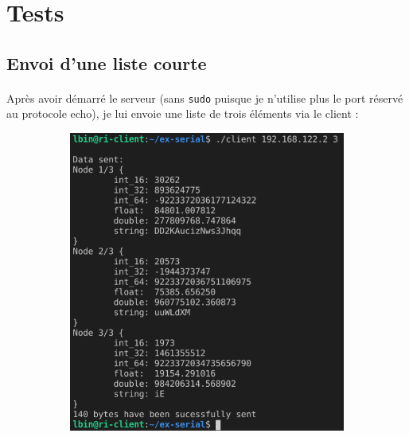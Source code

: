 \documentclass{article}
\begin{document}
    \newpage
    \section{Tests}
    \subsection{Envoi d'une liste courte}
    \paragraph{}
    Après avoir démarré le serveur (sans \texttt{sudo} puisque je n'utilise plus le port réservé au protocole echo), je lui envoie une liste de trois éléments via le client :
    \begin{figure}[H]
        \centering
        \begin{subfigure}[b]{.48\textwidth}
            \centering
            \includegraphics[width=\textwidth]{./screenshots/client-test-simple.png}
        \end{subfigure}
        \begin{subfigure}[b]{.48\textwidth}
            \centering

\end{subfigure}
\end{figure}
\end{document}
